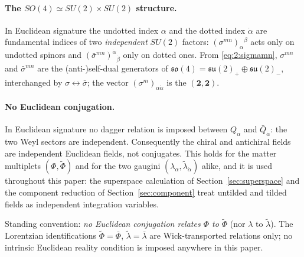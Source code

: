 \paragraph{The $SO(4)\simeq SU(2)\times SU(2)$ structure.} In Euclidean
signature the undotted index $\alpha$ and the dotted index $\dot\alpha$ are
fundamental indices of two \emph{independent} $SU(2)$ factors:
$(\sigma^{mn})_\alpha{}^\beta$ acts only on undotted spinors and
$(\bar\sigma^{mn})^{\dot\alpha}{}_{\dot\beta}$ only on dotted ones. From
\eqref{eq:2:sigmamn}, $\sigma^{mn}$ and $\bar\sigma^{mn}$ are the
(anti-)self-dual generators of
$\mathfrak{so}(4)=\mathfrak{su}(2)_+\oplus\mathfrak{su}(2)_-$, interchanged by
$\sigma\leftrightarrow\bar\sigma$; the vector $(\sigma^m)_{\alpha\dot\alpha}$
is the $(\mathbf 2,\mathbf 2)$.

\paragraph{No Euclidean conjugation.} In Euclidean signature no dagger
relation is imposed between $Q_\alpha$ and $\bar Q_{\dot\alpha}$: the two Weyl
sectors are independent. Consequently the chiral and antichiral fields are
independent Euclidean fields, not conjugates. This holds for the matter
multiplets $(\Phi,\widetilde\Phi)$ and for the two gaugini
$(\lambda_\alpha,\widetilde\lambda_{\dot\alpha})$ alike, and it is used
throughout this paper: the superspace calculation of
Section~\ref{sec:superspace} and the component reduction of
Section~\ref{sec:component} treat untilded and tilded fields as independent
integration variables.
\begin{remark}\label{rem:2:noconjugation}
Standing convention: \emph{no Euclidean conjugation relates $\Phi$ to
$\widetilde\Phi$} (nor $\lambda$ to $\widetilde\lambda$). The Lorentzian
identifications $\widetilde\Phi=\bar\Phi$,
$\widetilde\lambda=\bar\lambda$ are Wick-transported relations only; no
intrinsic Euclidean reality condition is imposed anywhere in this paper.
\end{remark}


